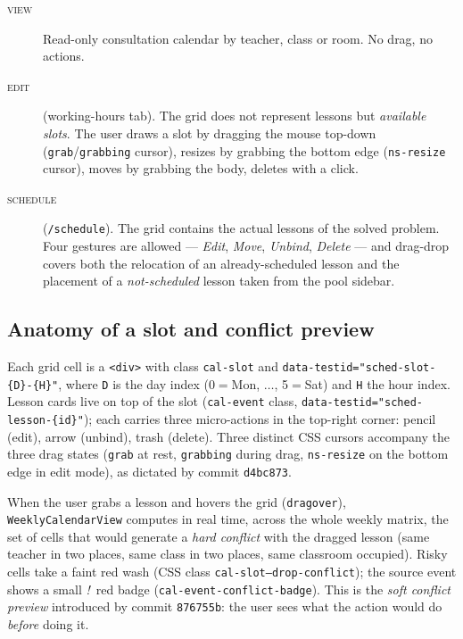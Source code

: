 \begin{description}
  \item[\textsc{view}] Read-only consultation calendar by
    teacher, class or room. No drag, no actions.
  \item[\textsc{edit}] (working-hours tab). The grid does not
    represent lessons but \emph{available slots}. The user
    draws a slot by dragging the mouse top-down
    (\texttt{grab}/\texttt{grabbing} cursor), resizes by
    grabbing the bottom edge (\texttt{ns-resize} cursor), moves
    by grabbing the body, deletes with a click.
  \item[\textsc{schedule}] (\texttt{/schedule}). The grid
    contains the actual lessons of the solved problem. Four
    gestures are allowed --- \emph{Edit}, \emph{Move},
    \emph{Unbind}, \emph{Delete} --- and drag-drop covers both
    the relocation of an already-scheduled lesson and the
    placement of a \emph{not-scheduled} lesson taken from the
    pool sidebar.
\end{description}

\subsection{Anatomy of a slot and conflict preview}

Each grid cell is a \texttt{<div>} with class \texttt{cal-slot}
and \texttt{data-testid="sched-slot-\{D\}-\{H\}"}, where
\texttt{D} is the day index (0$=$Mon, $\dots$, 5$=$Sat) and
\texttt{H} the hour index. Lesson cards live on top of the slot
(\texttt{cal-event} class, \texttt{data-testid="sched-lesson-\{id\}"});
each carries three micro-actions in the top-right corner: pencil
(edit), arrow (unbind), trash (delete). Three distinct CSS
cursors accompany the three drag states (\texttt{grab} at rest,
\texttt{grabbing} during drag, \texttt{ns-resize} on the bottom
edge in edit mode), as dictated by commit \texttt{d4bc873}.

When the user grabs a lesson and hovers the grid
(\texttt{dragover}), \texttt{WeeklyCalendarView} computes in
real time, across the whole weekly matrix, the set of cells that
would generate a \emph{hard conflict} with the dragged lesson
(same teacher in two places, same class in two places, same
classroom occupied). Risky cells take a faint red wash (CSS
class \texttt{cal-slot--drop-conflict}); the source event shows
a small \emph{!}\ red badge
(\texttt{cal-event-conflict-badge}). This is the \emph{soft
conflict preview} introduced by commit \texttt{876755b}: the
user sees what the action would do \emph{before} doing it.

